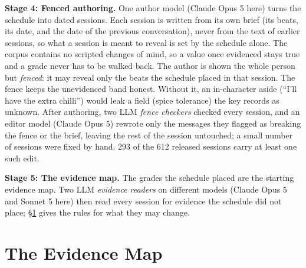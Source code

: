 \documentclass{article}
\begin{document}
\textbf{Stage 4: Fenced authoring.} One author model (Claude Opus 5 here) turns the schedule into
dated sessions. Each session is written from its own brief (its beats, its date, and the date of the
previous conversation), never from the text of earlier sessions, so what a session is meant to reveal is set by
the schedule alone. The corpus contains
no scripted changes of mind, so a value once evidenced stays true and a grade never has to be walked
back. The author is shown the whole person but \emph{fenced}: it may reveal only the beats the
schedule placed in that session. The fence keeps the unevidenced band honest. Without it, an
in-character aside (``I'll have the extra chilli'') would leak a field (spice tolerance) the key
records as unknown. After authoring, two LLM \emph{fence checkers} checked every session, and an editor model (Claude Opus 5) rewrote only the
messages they flagged as breaking the fence or the brief, leaving the rest of the session
untouched; a small number of sessions were fixed by hand. 293 of the 612 released sessions
carry at least one such edit.

\textbf{Stage 5: The evidence map.} The grades the schedule placed are the starting evidence map.
Two LLM \emph{evidence readers} on different models (Claude Opus 5 and Sonnet 5 here) then read every session for
evidence the schedule did not place; \S\ref{sec:map} gives the rules for what they may change.

\section{The Evidence Map}
\label{sec:map}
\end{document}
